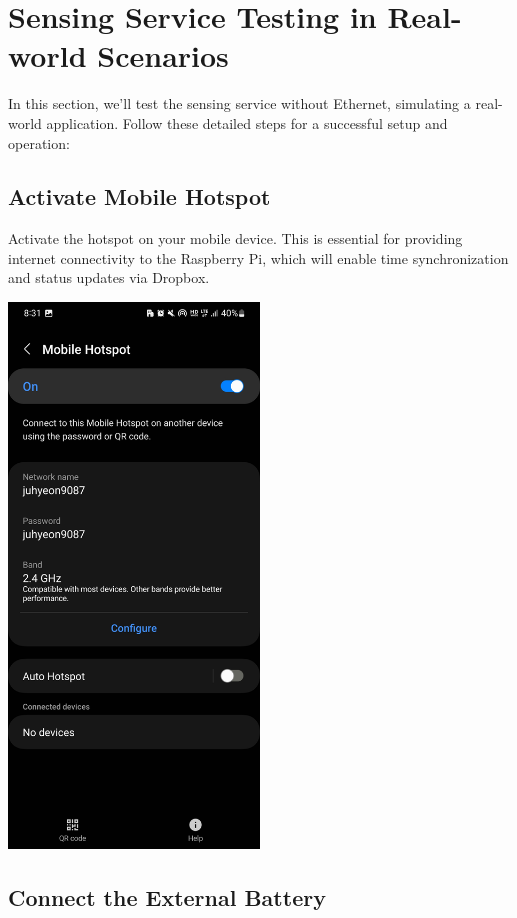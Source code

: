 \documentclass[
  letterpaper,
]{scrbook}
\begin{document}
\section{Sensing Service Testing in Real-world
Scenarios}\label{sensing-service-testing-in-real-world-scenarios}

In this section, we'll test the sensing service without Ethernet,
simulating a real-world application. Follow these detailed steps for a
successful setup and operation:

\subsection{Activate Mobile Hotspot}\label{activate-mobile-hotspot}

Activate the hotspot on your mobile device. This is essential for
providing internet connectivity to the Raspberry Pi, which will enable
time synchronization and status updates via Dropbox.

\includegraphics[width=0.5\textwidth,height=\textheight]{content/material/ch2/turnon_hotspot.jpg}

\subsection{Connect the External
Battery}\label{connect-the-external-battery}
\end{document}

